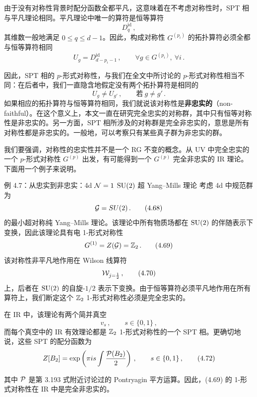  由于没有对称性背景时配分函数全都平凡，这意味着在不考虑对称性时，SPT 相与平凡理论相同。平凡理论中唯一的算符是恒等算符
\begin{equation}
  D^{\mathrm{id}}_q\,, \tag{4.65}
\end{equation}
其维数一般地满足 $0\le q\le d-1$。因此，构成对称性 $G^{(p_i)}$ 的拓扑算符必须全都与恒等算符相同
\begin{equation}
  U_g=D^{\mathrm{id}}_{d-p_i-1}\,,\qquad \forall g\in G^{(p_i)},\ \forall i\,. \tag{4.66}
\end{equation}

因此，SPT 相的 $p$-形式对称性，与我们在全文中所讨论的 $p$-形式对称性相当不同：在后者中，我们一直隐含地假定没有两个拓扑算符是相同的
\begin{equation}
  U_g\neq U_{g'}\,,\qquad \text{若}\ g\neq g'\,. \tag{4.67}
\end{equation}
如果相应的拓扑算符与恒等算符相同，我们就说该对称性是\textbf{非忠实的}（non-faithful）。在这个意义上，本文一直在研究完全忠实的对称群，其中只有恒等对称性是非忠实的。另一方面，SPT 相所涉及的对称群是完全非忠实的，意思是所有对称性都是非忠实的。一般地，可以考察只有某些真子群为非忠实的群。

我们要强调，对称性的忠实性并不是一个 RG 不变的概念。从 UV 中完全忠实的一个 $p$-形式对称性 $G^{(p)}$ 出发，有可能得到一个 $G^{(p)}$ 完全非忠实的 IR 理论。下面用一个例子来说明。

\begin{examplebox}{例 4.7：从忠实到非忠实：4d $\mathcal{N}=1$ $\mathrm{SU}(2)$ 超 Yang--Mills 理论}
考虑 4d 中规范群为
\begin{equation}
  \mathcal{G}=SU(2)\,. \tag{4.68}
\end{equation}
的最小超对称纯 Yang--Mills 理论。该理论中所有物质场都在 $\mathrm{SU}(2)$ 的伴随表示下变换，因此该理论具有电 1-形式对称性
\begin{equation}
  G^{(1)}=Z(\mathcal{G})=\mathbb{Z}_2\,. \tag{4.69}
\end{equation}
该对称性非平凡地作用在 Wilson 线算符
\begin{equation}
  \mathcal{W}_{j=\frac{1}{2}}\,, \tag{4.70}
\end{equation}
上，后者在 $\mathrm{SU}(2)$ 的自旋-$1/2$ 表示下变换。由于恒等算符必须平凡地作用在所有算符上，我们断定这个 $\mathbb{Z}_2$ 1-形式对称性必须是完全忠实的。

在 IR 中，该理论有两个简并真空
\begin{equation}
  v_s\,,\qquad s\in\{0,1\}\,, \tag{4.71}
\end{equation}
而每个真空中的 IR 有效理论都是 $\mathbb{Z}_2$ 1-形式对称性的一个 SPT 相。更确切地说，这些 SPT 的配分函数为
\begin{equation}
  Z[B_2]=\exp\left(\pi i s\int\frac{\mathcal{P}(B_2)}{2}\right)\,,\qquad s\in\{0,1\}\,, \tag{4.72}
\end{equation}

其中 $\mathcal{P}$ 是第 3.193 式附近讨论过的 Pontryagin 平方运算。因此，(4.69) 的 1-形式对称性在 IR 中是完全非忠实的。
\end{examplebox}

